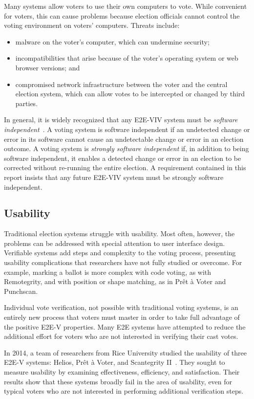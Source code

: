 Many systems allow voters to use their own computers to vote. While
convenient for voters, this can cause problems because election
officials cannot control the voting environment on voters'
computers. Threats include:
\begin{itemize}
\item malware on the voter's computer, which can undermine security;
\item incompatibilities that arise because of the voter's operating
  system or web browser versions; and
\item compromised network infrastructure between the voter and the
  central election system, which can allow votes to be intercepted or
  changed by third parties.
\end{itemize}

In general, it is widely recognized that any E2E-VIV system must be
\emph{software independent}~\cite{RivestWack}.  A voting system is
software independent if an undetected change or error in its software
cannot cause an undetectable change or error in an election outcome. A
voting system is \emph{strongly software independent} if, in addition
to being software independent, it enables a detected change or error
in an election to be corrected without re-running the entire election.
A requirement contained in this report insists that any future E2E-VIV
system must be strongly software independent.

\subsection{Usability}

Traditional election systems struggle with usability. Most often,
however, the problems can be addressed with special attention to user
interface design. Verifiable systems add steps and complexity to the
voting process, presenting usability complications that researchers
have not fully studied or overcome. For example, marking a ballot is
more complex with code voting, as with Remotegrity, and with position
or shape matching, as in Prêt à Voter and Punchscan. 

Individual vote verification, not possible with traditional voting
systems, is an entirely new process that voters must master in order
to take full advantage of the positive E2E-V properties. Many E2E
systems have attempted to reduce the additional effort for voters who
are not interested in verifying their cast votes.

In 2014, a team of researchers from Rice University studied the
usability of three E2E-V systems: Helios, Prêt à Voter, and
Scantegrity II~\cite{acemyan2014usability}. They sought to measure
usability by examining effectiveness, efficiency, and
satisfaction. Their results show that these systems broadly fail in
the area of usability, even for typical voters who are not interested
in performing additional verification steps.

